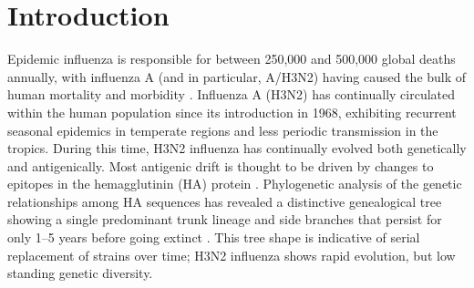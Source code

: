 \documentclass[11pt,oneside,letterpaper]{article}
\begin{document}

\section*{Introduction}

Epidemic influenza is responsible for between 250,000 and 500,000 global deaths annually, with influenza A (and in particular, A/H3N2) having caused the bulk of human mortality and morbidity \cite{flufactsheet}.  Influenza A (H3N2) has continually circulated within the human population since its introduction in 1968, exhibiting recurrent seasonal epidemics in temperate regions and less periodic transmission in the tropics.  During this time, H3N2 influenza has continually evolved both genetically and antigenically.  Most antigenic drift is thought to be driven by changes to epitopes in the hemagglutinin (HA) protein \cite{Nelson07NatRevGenet}.  Phylogenetic analysis of the genetic relationships among HA sequences has revealed a distinctive genealogical tree showing a single predominant trunk lineage and side branches that persist for only 1--5 years before going extinct \cite{Fitch97}.  This tree shape is indicative of serial replacement of strains over time; H3N2 influenza shows rapid evolution, but low standing genetic diversity.
\end{document}
